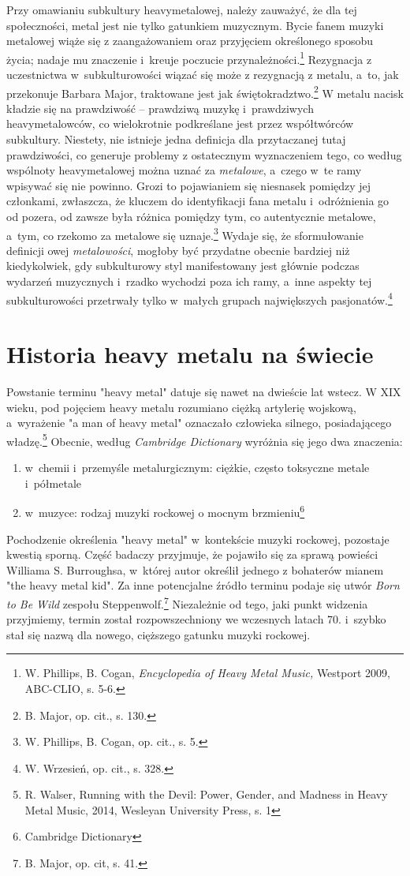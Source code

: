 \documentclass[12pt, a4paper, titlepage]{report}
\begin{document}
Przy omawianiu subkultury heavymetalowej, należy zauważyć, że dla tej społeczności, metal jest nie tylko gatunkiem muzycznym. Bycie fanem muzyki metalowej wiąże się z zaangażowaniem oraz przyjęciem określonego sposobu życia; nadaje mu znaczenie i~kreuje poczucie przynależności.\footnote{W. Phillips, B. Cogan, \textit{Encyclopedia of Heavy Metal Music,} Westport 2009, ABC-CLIO, s. 5-6.} Rezygnacja z uczestnictwa w~subkulturowości wiązać się może z rezygnacją z metalu, a~to, jak przekonuje Barbara Major, traktowane jest jak świętokradztwo.\footnote{B. Major, op. cit., s. 130.} W metalu nacisk kładzie się na prawdziwość -- prawdziwą muzykę i~prawdziwych heavymetalowców, co wielokrotnie podkreślane jest przez współtwórców subkultury. Niestety, nie istnieje jedna definicja dla przytaczanej tutaj prawdziwości, co generuje problemy z ostatecznym wyznaczeniem tego, co według wspólnoty heavymetalowej można uznać za \emph{metalowe}, a~czego w~te ramy wpisywać się nie powinno. Grozi to pojawianiem się niesnasek pomiędzy jej członkami, zwłaszcza, że kluczem do identyfikacji fana metalu i~odróżnienia go od pozera, od zawsze była różnica pomiędzy tym, co autentycznie metalowe, a~tym, co rzekomo za metalowe się uznaje.\footnote{W. Phillips, B. Cogan, op. cit., s. 5.} Wydaje się, że sformułowanie definicji owej \emph{metalowości}, mogłoby być przydatne obecnie bardziej niż kiedykolwiek, gdy subkulturowy styl  manifestowany jest głównie podczas wydarzeń muzycznych i~rzadko wychodzi poza ich ramy, a~inne aspekty tej subkulturowości przetrwały tylko w~małych grupach największych pasjonatów.\footnote{W. Wrzesień, op. cit., s. 328.}

\section{Historia heavy metalu na świecie}
Powstanie terminu "heavy metal" datuje się nawet na dwieście lat wstecz. W XIX wieku, pod pojęciem heavy metalu rozumiano ciężką artylerię wojskową, a~wyrażenie "a man of heavy metal" oznaczało człowieka silnego, posiadającego władzę.\footnote{R. Walser, Running with the Devil: Power, Gender, and Madness in Heavy Metal Music, 2014, Wesleyan University Press, s. 1}  Obecnie, według \textit{Cambridge Dictionary} wyróżnia się jego dwa znaczenia: 
\begin{enumerate}
\item w~chemii i~przemyśle metalurgicznym: ciężkie, często toksyczne metale  i~półmetale
\item w~muzyce: rodzaj muzyki rockowej o mocnym brzmieniu\footnote{Cambridge Dictionary}
\end{enumerate}
Pochodzenie określenia "heavy metal" w~kontekście muzyki rockowej, pozostaje kwestią sporną. Część badaczy przyjmuje, że pojawiło się za sprawą powieści Williama S. Burroughsa, w~której autor określił jednego z bohaterów mianem "the heavy metal kid". Za inne potencjalne źródło terminu podaje się utwór \textit{Born to Be Wild} zespołu Steppenwolf.\footnote{B. Major, op. cit, s. 41.} Niezależnie od tego, jaki punkt widzenia przyjmiemy, termin został rozpowszechniony we wczesnych latach 70. i~szybko stał się nazwą dla nowego, cięższego gatunku muzyki rockowej. 
\end{document}
